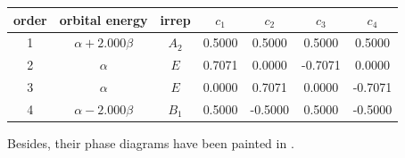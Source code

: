 		\begin{center}
		\setlength{\abovecaptionskip}{-0.5em}
		\begin{tabular}{ccccccc}\hline
		order 	& orbital energy & irrep & $c_1$ & $c_2$ & $c_3$ &$c_4$ \\ \hline
			1	&	$\alpha+2.000\beta$	&	$A_2$	&	0.5000	&	0.5000	&	0.5000	&	0.5000	\\
			2	&	$\alpha$	&	$E$	&	0.7071	&	0.0000	&	-0.7071	&	0.0000	\\
			3	&	$\alpha$	&	$E$	&	0.0000	&	0.7071	&	0.0000	&	-0.7071	\\
			4	&	$\alpha-2.000\beta$	&	$B_1$	&	0.5000	&	-0.5000	&	0.5000	&	-0.5000	\\ \hline
		\end{tabular}
		\end{center}
		
		Besides, their phase diagrams have been painted in .
		
